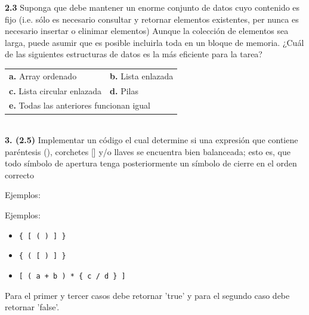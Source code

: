 \documentclass[twocolumn]{article}
\begin{document}
\textbf{2.3} Suponga que debe mantener un enorme conjunto de datos cuyo contenido es fijo (i.e. sólo es necesario consultar y retornar elementos existentes, per nunca es necesario insertar o elinimar elementos) Aunque la colección de elementos sea larga, puede asumir que es posible incluirla toda en un bloque de memoria. ¿Cuál de las siguientes estructuras de datos es la más eficiente para la tarea?

\begin{tabular}{ll}
\textbf{a.} Array ordenado & \textbf{b.} Lista enlazada \\
\textbf{c.} Lista circular enlazada & \textbf{d.} Pilas \\ 
\multicolumn{2}{l}{\textbf{e.} Todas las anteriores funcionan igual}
\end{tabular}\\

\textbf{3. (2.5)} Implementar un código el cual determine si una expresión que contiene paréntesis (), corchetes [] y/o llaves {} se encuentra bien balanceada; esto es, que todo símbolo de apertura tenga posteriormente un símbolo de cierre en el orden correcto

Ejemplos:

Ejemplos:

\begin{itemize}
\item \texttt{\{ [ ( ) ] \}}
\item \texttt{\{ ( [ ) ] \}}
\item \texttt{[ ( a + b ) * \{ c / d \} ]}
\end{itemize}

Para el primer y tercer casos debe retornar 'true' y para el segundo caso debe retornar 'false'.
\end{document}
